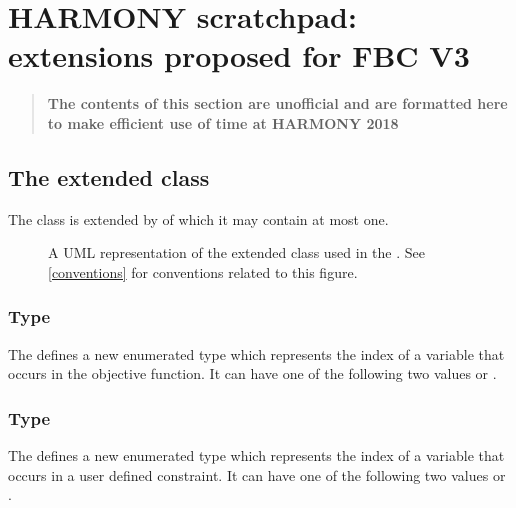 
\newpage
\section{HARMONY scratchpad: extensions proposed for FBC V3}

\begin{quote}
 \textbf{\Large The contents of this section are unofficial and are formatted here to make efficient use of time at HARMONY 2018}
\end{quote}

\subsection{The extended  class}
\label{model-class-kv}




The \SBML \Model class is extended by  of which it may contain at most one.

\begin{figure}[ht]
  \centering
  \caption{A UML representation of the extended \SBML \Model class used in
  the \FBCPackage. See \ref{conventions} for conventions related to this
  figure.}
  \label{fig:fbc_uml_model_new}
\end{figure}

\subsubsection{Type }
\label{primtype-fbcfluxobjectivevariabletype}

The \FBCPackage defines a new enumerated type  which
represents the index of a variable that occurs in the objective function. It can have one
of the following two values  or .

\subsubsection{Type }
\label{primtype-fbcuserconstraintvariabletype}

The \FBCPackage defines a new enumerated type  which
represents the index of a variable that occurs in a user defined constraint. It can have one
of the following two values  or .

